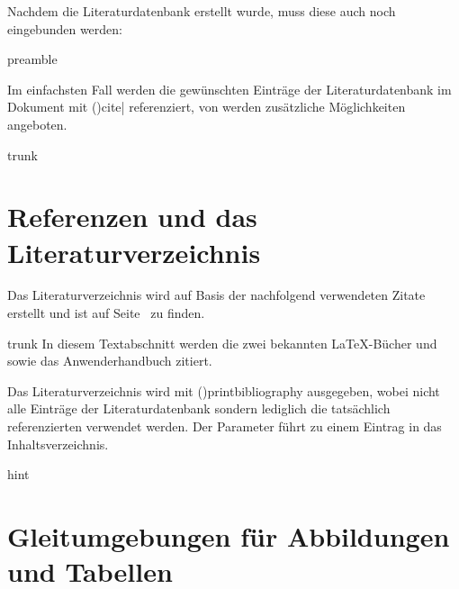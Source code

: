 \documentclass[%
  english,ngerman,%
  cdgeometry=no,DIV=12,%
  cd=false,cdfont=false,cdtitle=true,%
  headings=normal,%
  automark,%
  listof=toc,%
]{tudscrartcl}
\begin{document}
Nachdem die Literaturdatenbank erstellt wurde, muss diese auch noch eingebunden 
werden:
%
\begin{Code}{preamble}


\end{Code}

Im einfachsten Fall werden die gewünschten Einträge der Literaturdatenbank im 
Dokument mit \Macro(){cite|} referenziert, 
von  werden zusätzliche Möglichkeiten angeboten.
%
\begin{refsection}
\begin{Code}[nolst]{trunk}
\section{Referenzen und das Literaturverzeichnis}

Das Literaturverzeichnis wird auf Basis der nachfolgend verwendeten 
Zitate erstellt und ist auf Seite~\pageref{sec:bibliography} zu finden.
\end{Code}
\begin{Code}[input]{trunk}
In diesem Textabschnitt werden die zwei bekannten \LaTeX-Bücher
\cite{knuth84} und \cite{goossens94} sowie das Anwenderhandbuch
\cite{hanisch19} zitiert.

\end{Code}

Das Literaturverzeichnis wird mit \Macro(){printbibliography} 
ausgegeben, wobei nicht alle Einträge der Literaturdatenbank sondern lediglich 
die tatsächlich referenzierten verwendet werden. Der Parameter 
 führt zu einem Eintrag in das Inhaltsverzeichnis.
%
\begin{Code}{hint}
\printbibliography[heading=bibintoc]
\end{Code}
\begin{quoting}[rightmargin=0pt]
\makeatletter
\let\markboth\@gobbletwo
\let\markright\@gobble
\makeatother
\printbibliography
\end{quoting}
\end{refsection}



\section{%
  Gleitumgebungen für Abbildungen und Tabellen%
  \label{sec:floats}%
}
\end{document}
